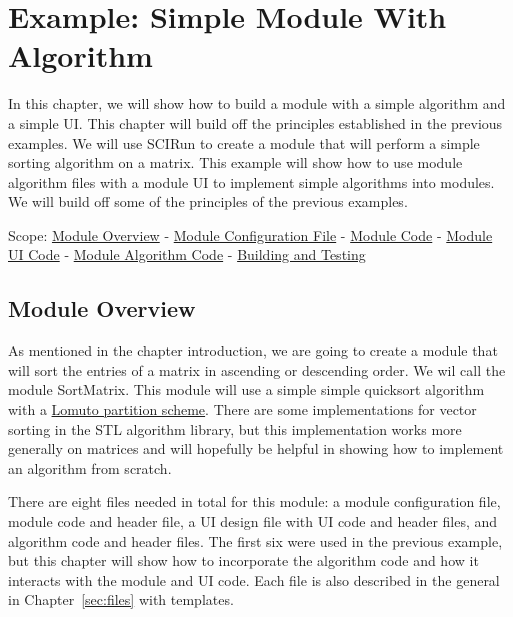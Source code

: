 \documentclass[fleqn,11pt,openany]{book}
\begin{document}
\chapter{Example: Simple Module With Algorithm}
\label{sec:ex_algo}

\begin{introduction}
In this chapter, we will show how to build a module with a simple algorithm and a simple UI.  
This chapter will build off the principles established in the previous examples.  
We will use SCIRun to create a module that will perform a simple sorting algorithm on a matrix. 
This example will show how to use module algorithm files with a module UI to implement simple algorithms into modules.  
We will build off some of the principles of the previous examples.
 
Scope: \hyperref[sec:alg_overview]{Module Overview} - \hyperref[sec:algoconfig]{Module Configuration File} 
- \hyperref[sec:algo_module]{Module Code} - \hyperref[sec:algo_ui]{Module UI Code} - \hyperref[sec:algo]{Module Algorithm Code} 
- \hyperref[sec:algo_building]{Building and Testing}

\end{introduction}

\section{Module Overview}
\label{sec:alg_overview}

As mentioned in the chapter introduction, we are going to create a module that will sort the entries of a matrix in ascending or descending order.  
We wil call the module SortMatrix.
This module will use a simple simple quicksort algorithm with a \href{https://en.wikipedia.org/wiki/Quicksort#Lomuto_partition_scheme}{Lomuto partition scheme}.  
There are some implementations for vector sorting in the STL algorithm library, but this implementation works more generally on matrices and will hopefully be helpful in showing how to implement an algorithm from scratch.

There are eight files needed in total for this module: a module configuration file, module code and header file, a UI design file with UI code and header files, and algorithm code and header files.  
The first six were used in the previous example, but this chapter will show how to incorporate the algorithm code and how it interacts with the module and UI code. 
Each file is also described in the general in Chapter~\ref{sec:files} with templates.
\end{document}
